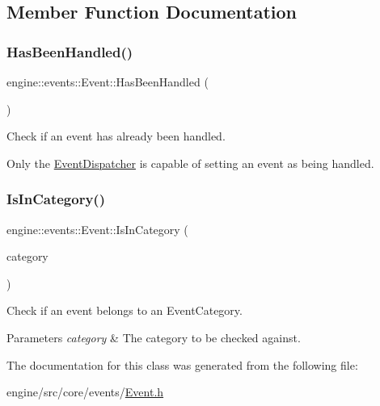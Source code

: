 \subsection{Member Function Documentation}
\mbox{\label{classengine_1_1events_1_1Event_a8d8413f3ea8c3d00b3f43a757a92f623}} 
\subsubsection{\texorpdfstring{Has\+Been\+Handled()}{HasBeenHandled()}}
{\footnotesize\ttfamily engine\+::events\+::\+Event\+::\+Has\+Been\+Handled (\begin{DoxyParamCaption}{ }\end{DoxyParamCaption})\hspace{0.3cm}{\ttfamily [inline]}}



Check if an event has already been handled. 

Only the \hyperlink{classengine_1_1events_1_1EventDispatcher}{Event\+Dispatcher} is capable of setting an event as being handled. \mbox{\label{classengine_1_1events_1_1Event_abf217454944fb4cceb6dee40d886a0c4}} 
\subsubsection{\texorpdfstring{Is\+In\+Category()}{IsInCategory()}}
{\footnotesize\ttfamily engine\+::events\+::\+Event\+::\+Is\+In\+Category (\begin{DoxyParamCaption}\item[{\hyperlink{Event_8h_a1e3bf91397b8a47069494aede2669474}{Event\+Category}}]{category }\end{DoxyParamCaption})\hspace{0.3cm}{\ttfamily [inline]}}



Check if an event belongs to an Event\+Category. 


\begin{DoxyParams}{Parameters}
{\em category} & The category to be checked against. \\
\hline
\end{DoxyParams}


The documentation for this class was generated from the following file\+:\begin{DoxyCompactItemize}
\item 
engine/src/core/events/\hyperlink{Event_8h}{Event.\+h}\end{DoxyCompactItemize}
